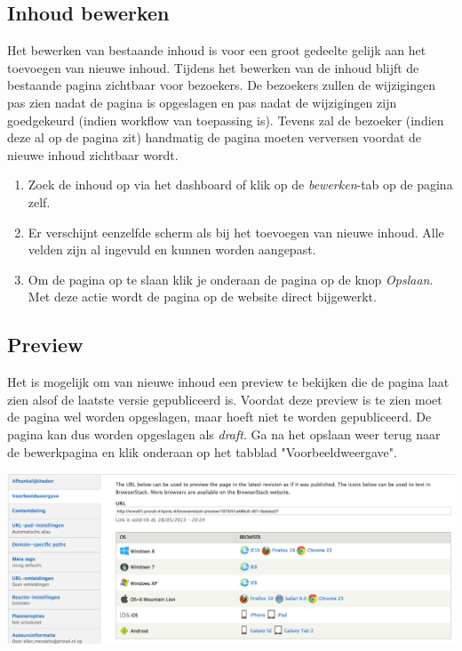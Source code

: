 \subsection{Inhoud bewerken}
Het bewerken van bestaande inhoud is voor een groot gedeelte gelijk aan het toevoegen van nieuwe inhoud. Tijdens het bewerken van de inhoud blijft de bestaande pagina zichtbaar voor bezoekers. De bezoekers zullen de wijzigingen pas zien nadat de pagina is opgeslagen en pas nadat de wijzigingen zijn goedgekeurd (indien workflow van toepassing is). Tevens zal de bezoeker (indien deze al op de pagina zit) handmatig de pagina moeten verversen voordat de nieuwe inhoud zichtbaar wordt.
\begin{enumerate}
\item Zoek de inhoud op via het dashboard of klik op de \emph{bewerken}-tab op de pagina zelf.
\item Er verschijnt eenzelfde scherm als bij het toevoegen van nieuwe inhoud. Alle velden zijn al ingevuld en kunnen worden aangepast.
\item Om de pagina op te slaan klik je onderaan de pagina op de knop \emph{Opslaan}. Met deze actie wordt de pagina op de website direct bijgewerkt.
\end{enumerate}


\subsection{Preview}
Het is mogelijk om van nieuwe inhoud een preview te bekijken die de pagina laat zien alsof de laatste versie gepubliceerd is. Voordat deze preview is te zien moet de pagina wel worden opgeslagen, maar hoeft niet te worden gepubliceerd. De pagina kan dus worden opgeslagen als \emph{draft}. Ga na het opslaan weer terug naar de bewerkpagina en klik onderaan op het tabblad "Voorbeeldweergave".

\begin{center}
\includegraphics[width=\textwidth]{img/browserstack1.png}
\end{center}


